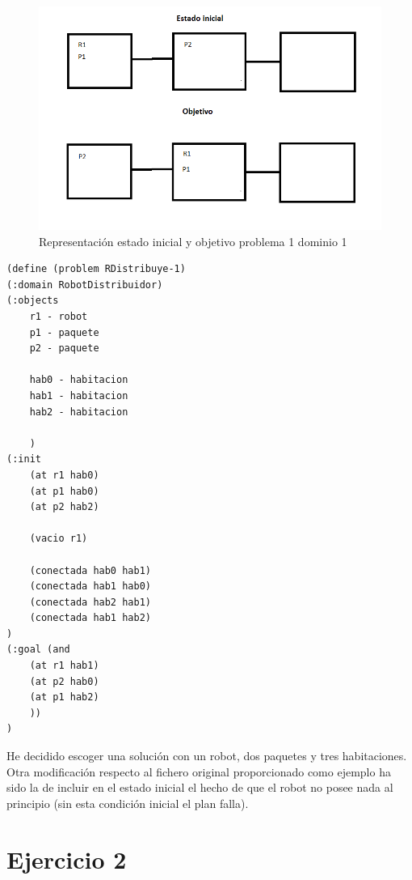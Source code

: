 \begin{figure}[h]
\centering
\includegraphics[width=1\linewidth]{p1}
\caption{Representación estado inicial y objetivo problema 1 dominio 1}
\label{fig:p1}
\end{figure}


	\begin{lstlisting}[language=SH]
(define (problem RDistribuye-1)
(:domain RobotDistribuidor)
(:objects
	r1 - robot
	p1 - paquete
	p2 - paquete
	
	hab0 - habitacion
	hab1 - habitacion
	hab2 - habitacion

	)
(:init
	(at r1 hab0)
	(at p1 hab0)
	(at p2 hab2)
	
	(vacio r1)
	
	(conectada hab0 hab1)
	(conectada hab1 hab0)
	(conectada hab2 hab1)
	(conectada hab1 hab2)
)
(:goal (and
	(at r1 hab1)
	(at p2 hab0)
	(at p1 hab2)
	))
)
	\end{lstlisting}
	
	He decidido escoger una solución con un robot, dos paquetes y tres habitaciones. Otra modificación respecto al fichero original proporcionado como ejemplo ha sido la de incluir en el estado inicial el hecho de que el robot no posee nada al principio (sin esta condición inicial el plan falla).



\section{Ejercicio 2}

